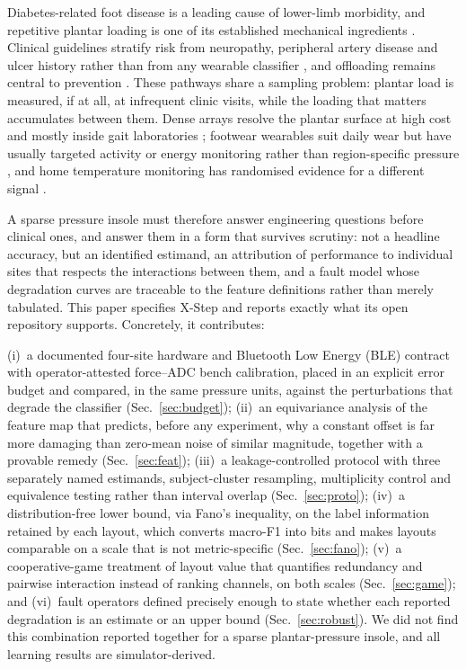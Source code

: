 \documentclass[10pt,conference,a4paper]{IEEEtran}
\begin{document}
Diabetes-related foot disease is a leading cause of lower-limb morbidity, and
repetitive plantar loading is one of its established mechanical ingredients
\cite{armstrong2017,fernando2014}. Clinical guidelines stratify risk from
neuropathy, peripheral artery disease and ulcer history rather than from any
wearable classifier \cite{iwgdf2023}, and offloading remains central to
prevention \cite{bus2016,cavanagh2010}. These pathways share a sampling
problem: plantar load is measured, if at all, at infrequent clinic visits,
while the loading that matters accumulates between them. Dense arrays resolve
the plantar surface at high cost and mostly inside gait laboratories
\cite{razak2012}; footwear wearables suit daily wear but have usually targeted
activity or energy monitoring rather than region-specific pressure
\cite{hegde2016,hegde2014}, and home temperature monitoring has randomised
evidence for a different signal \cite{armstrong2007}.

A sparse pressure insole must therefore answer engineering questions before
clinical ones, and answer them in a form that survives scrutiny: not a headline
accuracy, but an identified estimand, an attribution of performance to
individual sites that respects the interactions between them, and a fault model
whose degradation curves are traceable to the feature definitions rather than
merely tabulated. This paper specifies X-Step and reports exactly what its open
repository supports. Concretely, it contributes:

(i)~a documented four-site hardware and Bluetooth Low Energy (BLE) contract
with operator-attested force--ADC bench calibration, placed in an explicit
error budget and compared, in the same pressure units, against the
perturbations that degrade the classifier (Sec.~\ref{sec:budget});
(ii)~an equivariance analysis of the feature map that predicts, before any
experiment, why a constant offset is far more damaging than zero-mean noise of
similar magnitude, together with a provable remedy (Sec.~\ref{sec:feat});
(iii)~a leakage-controlled protocol with three separately named estimands,
subject-cluster resampling, multiplicity control and equivalence testing rather
than interval overlap (Sec.~\ref{sec:proto});
(iv)~a distribution-free lower bound, via Fano's inequality, on the label
information retained by each layout, which converts macro-F1 into bits and
makes layouts comparable on a scale that is not metric-specific
(Sec.~\ref{sec:fano});
(v)~a cooperative-game treatment of layout value that quantifies redundancy and
pairwise interaction instead of ranking channels, on both scales
(Sec.~\ref{sec:game}); and (vi)~fault operators defined precisely enough to
state whether each reported degradation is an estimate or an upper bound
(Sec.~\ref{sec:robust}). We did not find this combination reported together for
a sparse plantar-pressure insole, and all learning results are
simulator-derived.
\end{document}
